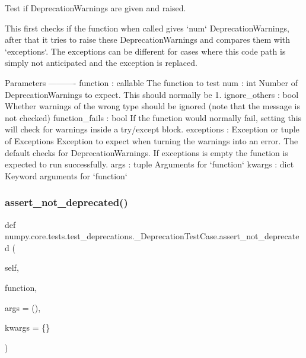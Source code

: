 \begin{DoxyVerb}Test if DeprecationWarnings are given and raised.

This first checks if the function when called gives `num`
DeprecationWarnings, after that it tries to raise these
DeprecationWarnings and compares them with `exceptions`.
The exceptions can be different for cases where this code path
is simply not anticipated and the exception is replaced.

Parameters
----------
function : callable
    The function to test
num : int
    Number of DeprecationWarnings to expect. This should normally be 1.
ignore_others : bool
    Whether warnings of the wrong type should be ignored (note that
    the message is not checked)
function_fails : bool
    If the function would normally fail, setting this will check for
    warnings inside a try/except block.
exceptions : Exception or tuple of Exceptions
    Exception to expect when turning the warnings into an error.
    The default checks for DeprecationWarnings. If exceptions is
    empty the function is expected to run successfully.
args : tuple
    Arguments for `function`
kwargs : dict
    Keyword arguments for `function`
\end{DoxyVerb}
 \mbox{\label{classnumpy_1_1core_1_1tests_1_1test__deprecations_1_1__DeprecationTestCase_af8dcb2b22687abd6271dc97c5b7c258a}} 
\subsubsection{\texorpdfstring{assert\+\_\+not\+\_\+deprecated()}{assert\_not\_deprecated()}}
{\footnotesize\ttfamily def numpy.\+core.\+tests.\+test\+\_\+deprecations.\+\_\+\+Deprecation\+Test\+Case.\+assert\+\_\+not\+\_\+deprecated (\begin{DoxyParamCaption}\item[{}]{self,  }\item[{}]{function,  }\item[{}]{args = {\ttfamily ()},  }\item[{}]{kwargs = {\ttfamily \{\}} }\end{DoxyParamCaption})}

